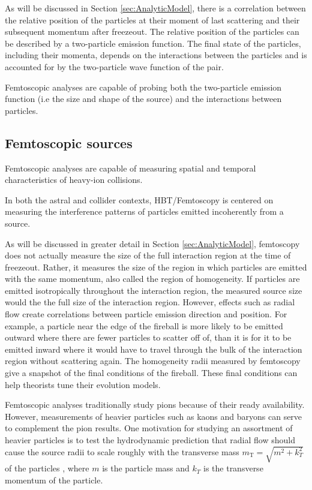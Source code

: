 As will be discussed in Section \ref{sec:AnalyticModel}, there is a correlation between the relative position of the particles at their moment of last scattering and their subsequent momentum after freezeout.
The relative position of the particles can be described by a two-particle emission function. The final state of the particles, including their momenta, depends on the interactions between the particles and is accounted for by the two-particle wave function of the pair.

Femtoscopic analyses are capable of probing both the two-particle emission function (i.e the size and shape of the source) and the interactions between particles. 
\subsection{Femtoscopic sources}

Femtoscopic analyses are capable of measuring spatial and temporal characteristics of heavy-ion collisions.

In both the astral and collider contexts, HBT/Femtoscopy is centered on measuring the interference patterns of particles emitted incoherently from a source.

As will be discussed in greater detail in Section \ref{sec:AnalyticModel}, femtoscopy does not actually measure the size of the full interaction region at the time of freezeout.
Rather, it measures the size of the region in which particles are emitted with the same momentum, also called the region of homogeneity.
If particles are emitted isotropically throughout the interaction region, the measured source size would the the full size of the interaction region.
However, effects such as radial flow create correlations between particle emission direction and position. 
For example, a particle near the edge of the fireball is more likely to be emitted outward where there are fewer particles to scatter off of, than it is for it to be emitted inward where it would have to travel through the bulk of the interaction region without scattering again. 
The homogeneity radii measured by femtoscopy give a snapshot of the final conditions of the fireball.
These final conditions can help theorists tune their evolution models.

Femtoscopic analyses traditionally study pions \cite{Goldhaber:1960sf,Aamodt:2011mr} because of their ready availability.  
However, measurements of heavier particles such as kaons \cite{Abelev:2012ms} and baryons \cite{Gos:2007cj} can serve to complement the pion results.  
One motivation for studying an assortment of heavier particles is to test the hydrodynamic prediction that radial flow should cause the source radii to scale roughly with the transverse mass $m_{\mathrm{T}} = \sqrt{m^2 + k^2_T}$ of the particles \cite{Csorgo:1995bi,Lisa:2005dd}, where $m$ is the particle mass and $k_T$ is the transverse momentum of the particle.

